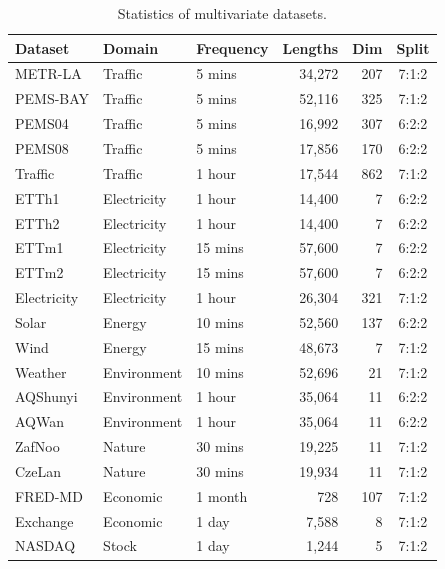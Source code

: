 \documentclass[sigconf, nonacm, pdfa]{acmart}
\begin{document}
\renewcommand{\arraystretch}{0.85} %
\begin{table}[t]
\caption{Statistics of multivariate datasets.}
\label{Multivariate datasets}
\footnotesize
\begin{tabular}{@{}lllrrc@{}}

\toprule
Dataset      & Domain      & Frequency & Lengths & Dim & Split  \\ \midrule
METR-LA     & Traffic     & 5 mins    & 34,272      & 207      & 7:1:2  \\
PEMS-BAY    & Traffic     & 5 mins    & 52,116      & 325      & 7:1:2 \\
PEMS04       & Traffic     & 5 mins    & 16,992      & 307      & 6:2:2 \\
PEMS08       & Traffic     & 5 mins    & 17,856      & 170      & 6:2:2 \\
Traffic      & Traffic     & 1 hour    & 17,544      & 862      & 7:1:2 \\
ETTh1       & Electricity & 1 hour     & 14,400      & 7        & 6:2:2 \\
ETTh2       & Electricity & 1 hour    & 14,400      & 7        & 6:2:2 \\
ETTm1       & Electricity & 15 mins   & 57,600      & 7        & 6:2:2 \\
ETTm2       & Electricity & 15 mins   & 57,600      & 7        & 6:2:2 \\
Electricity  & Electricity & 1 hour    & 26,304      & 321      & 7:1:2 \\
Solar       & Energy      & 10 mins   & 52,560      & 137      & 6:2:2  \\
Wind        & Energy & 15 mins   & 48,673      & 7        & 7:1:2  \\
Weather     & Environment & 10 mins   & 52,696      & 21       & 7:1:2 \\
AQShunyi     & Environment & 1 hour    & 35,064      & 11       & 6:2:2 \\
AQWan        & Environment & 1 hour    & 35,064      & 11       & 6:2:2 \\
ZafNoo       & Nature      & 30 mins   & 19,225      & 11       & 7:1:2 \\
CzeLan      & Nature      & 30 mins   & 19,934      & 11       & 7:1:2 \\
FRED-MD       & Economic    & 1 month   & 728        & 107      & 7:1:2 \\
Exchange & Economic    & 1 day      & 7,588       & 8        & 7:1:2 \\
NASDAQ       & Stock       & 1 day     & 1,244       & 5        & 7:1:2 \\

\end{tabular}
\end{table}
\end{document}
